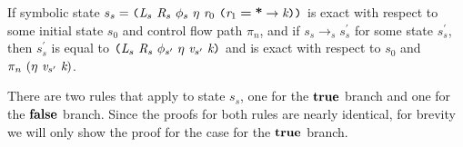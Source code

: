 \begin{lemma}
\label{lem:compare}
If symbolic state $s_s =  \lp \cfgnt{L}_s\ \cfgnt{R}_s\ \phi_s\ \eta\ \cfgnt{r}_0\ \lp \cfgnt{r}_1\; \cfgt{=}\; \cfgt{*} \rightarrow \cfgnt{k}\rp \rp$ is exact with respect to some initial state $s_0$ and control flow path $\pi_n$, and if $s_s \rightarrow_s s_s^\prime$ for some state $s_s^\prime$, then $s_s^\prime$ is equal to $ \lp \cfgnt{L}_s\ \cfgnt{R}_s\ \phi_{s^\prime}\ \eta\ \cfgnt{v}_{s^\prime}\ \cfgnt{k}\rp$ and is exact with respect to $s_0$ and $\pi_n \ (\eta\ \cfgnt{v}_{s^\prime}\ \cfgnt{k})$.
\end{lemma}
There are two rules that apply to state $s_s$, one for the $\textbf{true}$ branch and one for the $\textbf{false}$ branch. Since the proofs for both rules are nearly identical, for brevity we will only show the proof for the case for the $\textbf{true}$ branch. 
